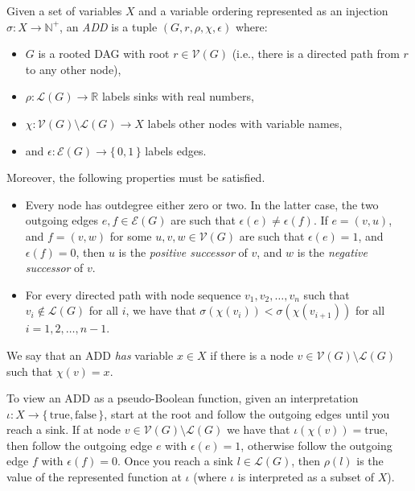 \begin{definition} \label{def:add}
  Given a set of variables $X$ and a variable ordering represented as an injection
  $\sigma\colon X \to \mathbb{N}^+$, an \emph{ADD} is a tuple $(G, r, \rho, \chi, \epsilon)$ where:
  \begin{itemize}
  \item $G$ is a rooted DAG with root $r \in \mathcal{V}(G)$
    (i.e., there is a directed path from $r$ to any other node),
  \item $\rho\colon \mathcal{L}(G) \to \mathbb{R}$ labels sinks with real
    numbers,
  \item $\chi\colon \mathcal{V}(G) \setminus \mathcal{L}(G) \to X$ labels other
    nodes with variable names,
  \item and $\epsilon\colon \mathcal{E}(G) \to \{\,0, 1\,\}$ labels edges.
  \end{itemize}
  Moreover, the following properties must be satisfied.
  \begin{itemize}
  \item Every node has outdegree either zero or two. In the latter case, the two
    outgoing edges $e, f \in \mathcal{E}(G)$ are such that $\epsilon(e) \ne \epsilon(f)$. If $e = (v, u)$, and $f = (v, w)$ for some $u, v, w \in \mathcal{V}(G)$ are such that $\epsilon(e) = 1$, and $\epsilon(f) = 0$, then $u$ is the \emph{positive successor} of $v$, and $w$ is the \emph{negative successor} of $v$.
  \item For every directed path with node sequence $v_1, v_2, \dots, v_n$ such
    that $v_i \not\in \mathcal{L}(G)$ for all $i$, we have that
    $\sigma(\chi(v_i)) < \sigma(\chi(v_{i+1}))$ for all $i = 1, 2, \dots, n -
    1$.
  \end{itemize}
  We say that an ADD \emph{has} variable $x \in X$ if there is a node $v \in
  \mathcal{V}(G) \setminus \mathcal{L}(G)$ such that $\chi(v) = x$.
\end{definition}

To view an ADD as a pseudo-Boolean function, given an interpretation $\iota\colon X \to \{\, \mathrm{true}, \mathrm{false} \,\}$, start at the root and follow the outgoing edges until you reach a sink. If at node $v \in \mathcal{V}(G) \setminus \mathcal{L}(G)$ we have that $\iota(\chi(v)) = \mathrm{true}$, then follow the outgoing edge $e$ with $\epsilon(e) = 1$, otherwise follow the outgoing edge $f$ with $\epsilon(f) = 0$. Once you reach a sink $l \in \mathcal{L}(G)$, then $\rho(l)$ is the value of the represented function at $\iota$ (where $\iota$ is interpreted as a subset of $X$).

